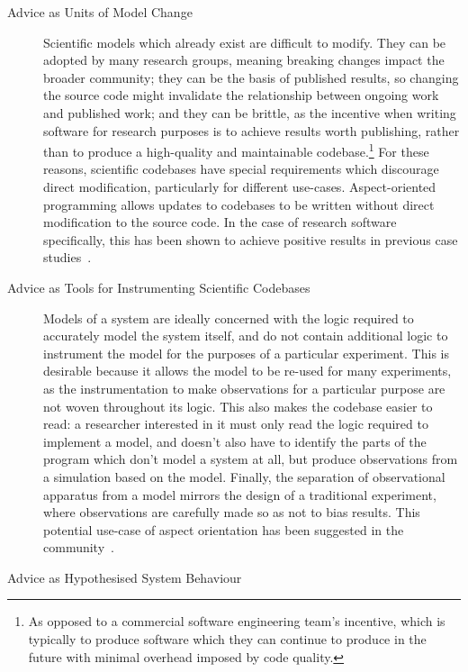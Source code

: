 \begin{description}
  \item[Advice as Units of Model Change] Scientific models which already exist
    are difficult to modify. They can be 
    adopted by many research groups, meaning breaking changes impact the broader
    community; they can be the basis of published results, so changing the source
    code might invalidate the relationship between ongoing work and published work;
    and they can be brittle, as the incentive when writing software for research
    purposes is to achieve results worth publishing, rather than to produce a
    high-quality and maintainable codebase.\footnote{As opposed to a commercial
      software engineering team's incentive, which is typically to produce software
      which they can continue to produce in the future with minimal overhead imposed
    by code quality.} For these reasons, scientific codebases have special
    requirements which discourage direct modification, particularly for
    different use-cases. Aspect-oriented programming allows updates to codebases to be
    written without direct modification to the source code. In the case of
    research software specifically, this has been shown to achieve positive
    results in previous case studies~\cite{ionescu2009aspect}.

  \item[Advice as Tools for Instrumenting Scientific Codebases] Models of a
    system are ideally concerned with the logic required to accurately
    model the system itself, and do not contain additional logic to instrument the
    model for the purposes of a particular experiment. This is desirable because it
    allows the model to be re-used for many experiments, as the instrumentation to
    make observations for a particular purpose are not woven throughout its logic.
    This also makes the codebase easier to read: a researcher interested in it
    must only read the logic required to implement a model, and doesn't
    also have to identify the parts of the program which don't model a system at
    all, but produce observations from a simulation based on the model. Finally,
    the separation of observational apparatus from a model mirrors the design of
    a traditional experiment, where observations are carefully made so as not to
    bias results. This potential use-case of aspect orientation has been
    suggested in the community~\cite{gulyas1999use}.

  \item[Advice as Hypothesised System Behaviour] 
\end{description}





